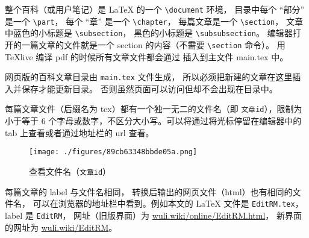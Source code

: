 整个百科（或用户笔记）是 LaTeX 的一个 \verb|\document| 环境， 目录中每个 “部分” 是一个 \verb|\part|， 每个 “章” 是一个 \verb|\chapter|， 每篇文章是一个 \verb|\section|， 文章中蓝色的小标题是 \verb|\subsection|， 黑色的小标题是 \verb|\subsubsection|。 编辑器打开的一篇文章的文件就是一个 section 的内容（不需要 \verb|\section| 命令）。 用 TeXlive 编译 pdf 的时候所有文章文件都会通过 \verb|| 插入到主文件 main.tex 中。

网页版的百科文章目录由 \verb|main.tex| 文件生成， 所以必须把新建的文章在这里插入并保存才能更新目录。 否则虽然页面可以访问但却不会出现在目录中。

每篇文章文件（后缀名为 tex）都有一个独一无二的文件名（即 \verb`文章id`），限制为小于等于 6 个字母或数字，不区分大小写。可以将通过将光标停留在编辑器中的 tab 上查看或者通过地址栏的 url 查看。

\begin{figure}[ht]
\centering
\texttt{[image: ./figures/89cb63348bbde05a.png]}
\caption{查看文件名（\verb`文章id`）} \label{fig_editor_2}
\end{figure}

每篇文章的 label 与文件名相同， 转换后输出的网页文件（html）也有相同的文件名， 可以在浏览器的地址栏中看到。例如本文的 LaTeX 文件是 \verb|EditRM.tex|， label 是 \verb|EditRM|， 网址（旧版界面）为 \href{https://wuli.wiki/online/EditRM.html}{wuli.wiki/online/EditRM.html}， 新界面的网址为 \href{https://wuli.wiki/EditRM}{wuli.wiki/EditRM}。


